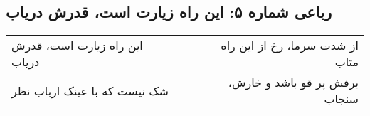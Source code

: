 \begin{center}
\section*{رباعی شماره ۵: این راه زیارت است، قدرش دریاب}
\label{sec:005}
\begin{longtable}{l p{0.5cm} r}
این راه زیارت است، قدرش دریاب
&&
از شدت سرما، رخ از این راه متاب
\\
شک نیست که با عینک ارباب نظر
&&
برفش پر قو باشد و خارش، سنجاب
\\
\end{longtable}
\end{center}
